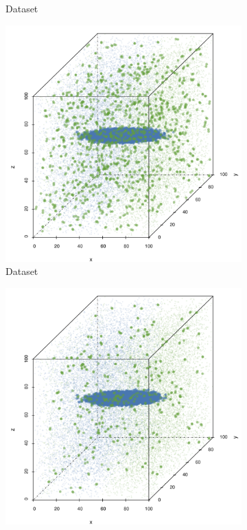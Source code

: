\begin{figure}
\begin{subfigure}{0.23\textwidth}
		\caption{Dataset \baakmanOne}
		\label{fig:discussion:singleSphere:mbeLowerError:baakman1}
	\end{subfigure}	
	\begin{subfigure}{0.23\textwidth}
		\centering
		\includegraphics[keepaspectratio=true, width=\textwidth, height=0.23\textheight]{discussion/img/baakman_4_abs_error_mbeSmallerThansambe}
		\caption{Dataset \baakmanFour}
		\label{fig:discussion:singleSphere:mbeLowerError:baakman4}
	\end{subfigure}		
	\begin{subfigure}{0.23\textwidth}
		\centering
		\includegraphics[keepaspectratio=true, width=\textwidth, height=0.23\textheight]{discussion/img/baakman_5_abs_error_mbeSmallerThansambe}

\end{subfigure}
\end{figure}
